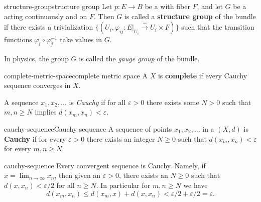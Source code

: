 \begin{topic}{structure-group}{structure group}
    Let $p : E \to B$ be a  with fiber $F$, and let $G$ be a  acting continuously and  on $F$. Then $G$ is called a \textbf{structure group} of the bundle if there exists a trivialization $\{ (U_i, \varphi_{ij} : E|_{U_i} \xrightarrow{\sim} U_i \times F) \}$ such that the transition functions $\varphi_i \circ \varphi_j^{-1}$ take values in $G$. 
    
    In physics, the group $G$ is called the \textit{gauge group} of the bundle.
\end{topic}


\begin{topic}{complete-metric-space}{complete metric space}
    A  $X$ is \textbf{complete} if every Cauchy sequence converges in $X$.
    
    A sequence $x_1, x_2, \ldots$ is \textit{Cauchy} if for all $\varepsilon > 0$ there exists some $N > 0$ such that $m, n \ge N$ implies $d(x_m, x_n) < \varepsilon$.
\end{topic}

\begin{topic}{cauchy-sequence}{Cauchy sequence}
    A sequence of points $x_1, x_2, \ldots$ in a  $(X, d)$ is \textbf{Cauchy} if for every $\varepsilon > 0$ there exists an integer $N \ge 0$ such that $d(x_m, x_n) < \varepsilon$ for every $m, n \ge N$.
\end{topic}

\begin{example}{cauchy-sequence}
    Every convergent sequence is Cauchy. Namely, if $x = \lim_{n \to \infty} x_n$, then given an $\varepsilon > 0$, there exists an $N \ge 0$ such that $d(x, x_n) < \varepsilon / 2$ for all $n \ge N$. In particular for $m, n \ge N$ we have
    \[ d(x_m, x_n) \le d(x_m, x) + d(x, x_n) < \varepsilon/2 + \varepsilon/2 = \varepsilon . \]
\end{example}

